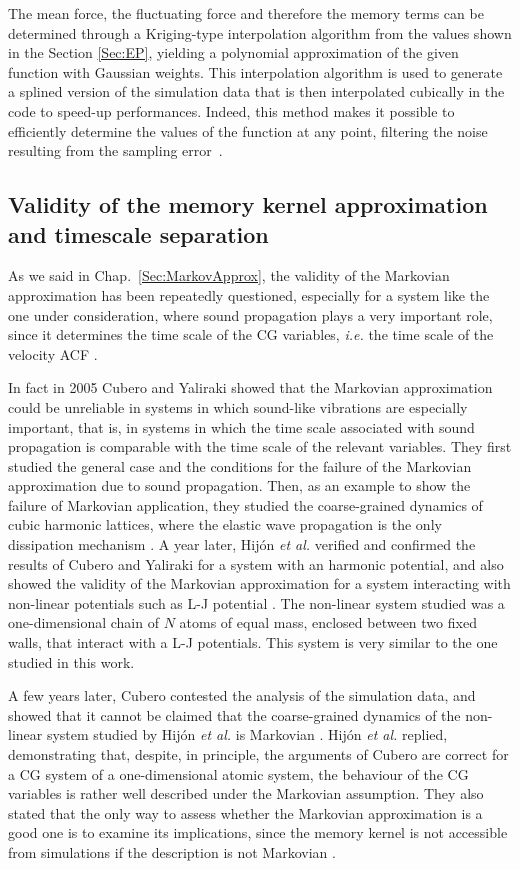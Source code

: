 \documentclass[10pt,a4paper]{book}
\theoremstyle{definition}
\begin{document}
The mean force, the fluctuating force and therefore the memory terms can be determined through a Kriging-type interpolation algorithm \cite{Jones2001} from the values shown in the Section \ref{Sec:EP}, yielding a polynomial approximation of the given function with Gaussian weights. This interpolation algorithm is used to generate a splined version of the simulation data that is then interpolated cubically in the code to speed-up performances. Indeed, this method makes it possible to efficiently determine the values of the function at any point, filtering the noise resulting from the sampling error~\cite{DiPasquale2019}.


\subsection{Validity of the memory kernel approximation and timescale separation}
\label{Sec:ValidAppMARK}

As we said in Chap.~\ref{Sec:MarkovApprox}, the validity of the Markovian approximation has been repeatedly questioned, especially for a system like the one under consideration, where sound propagation plays a very important role, since it determines the time scale of the CG variables, \textit{i.e.} the time scale of the velocity ACF \cite{CommentCubero}. 

In fact in 2005 Cubero and Yaliraki showed that the Markovian approximation could be unreliable in systems in which sound-like vibrations are especially important, that is, in systems in which the time scale associated with sound propagation is comparable with the time scale of the relevant variables. They first studied the general case and the conditions for the failure of the Markovian approximation due to sound propagation. Then, as an example to show the failure of Markovian application, they studied the coarse-grained dynamics of cubic harmonic lattices, where the elastic wave propagation is the only dissipation mechanism \cite{Cubero2005}.
A year later, Hij\'on \textit{et al.} verified and confirmed the results of Cubero and Yaliraki for a system with an harmonic potential, and also showed the validity of the Markovian approximation for a system interacting with non-linear potentials such as L-J potential \cite{Hijon2006}. The non-linear system studied was a one-dimensional chain of $N$ atoms of equal mass, enclosed between two fixed walls, that interact with a L-J potentials. This system is very similar to the one studied in this work.

\noindent
A few years later, Cubero contested the analysis of the simulation data, and showed that it cannot be claimed that the coarse-grained dynamics of the non-linear system studied by Hij\'on \textit{et al.} is Markovian \cite{CommentCubero}. Hij\'on \textit{et al.} replied, demonstrating that, despite, in principle, the arguments of Cubero are correct for a CG system of a one-dimensional atomic system, the behaviour of the CG variables is rather well described under the Markovian assumption. They also stated that the only way to assess whether the Markovian approximation is a good one is to examine its implications, since the memory kernel is not accessible from simulations if the description is not Markovian \cite{ResponseCommentHijon}.
\end{document}
